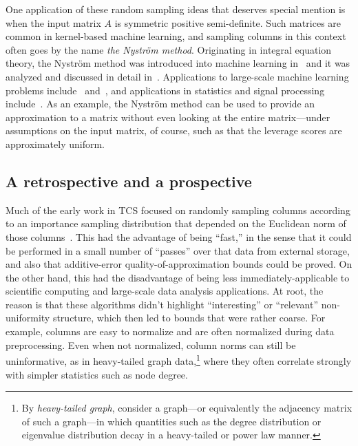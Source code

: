 \documentclass[twoside]{article}
\begin{document}
One application of these random sampling ideas that deserves special mention 
is when the input matrix $A$ is symmetric positive semi-definite. 
Such matrices are common in kernel-based machine learning, and sampling 
columns in this context often goes by the name \emph{the Nystr\"{o}m 
method}.
Originating in integral equation theory, the Nystr\"{o}m method was 
introduced into machine learning in~\cite{WS01} and it was analyzed and
discussed in detail in~\cite{dm_kernel_JRNL}.
Applications to large-scale machine learning problems 
include~\cite{TKR08,KMT09,KMT09c} and~\cite{ZTK08,LKL10,ZK10}, and
applications in statistics and signal processing 
include~\cite{PWT05,BW07_WKSHP,BW07_TR,SW08,BW08,BW09_PNAS,BW09_JRNL}.
As an example, the Nystr\"{o}m method can be used to provide an 
approximation to a matrix without even looking at the entire matrix---under 
assumptions on the input matrix, of course, such as that the leverage scores 
are approximately uniform.

\subsection{A retrospective and a prospective}

Much of the early work in TCS focused on randomly sampling columns according 
to an importance sampling distribution that depended on the Euclidean norm 
of those 
columns~\cite{FKV04,DFKVV04_JRNL,dkm_matrix1,dkm_matrix2,dkm_matrix3,RV07}.
This had the advantage of being ``fast,'' in the sense that it could be
performed in a small number of ``passes'' over that data from external 
storage, and also that additive-error quality-of-approximation bounds could 
be proved.
On the other hand, this had the disadvantage of being less 
immediately-applicable to scientific computing and large-scale data analysis 
applications.
At root, the reason is that these algorithms didn't highlight ``interesting'' or 
``relevant'' non-uniformity structure, which then led to bounds that were 
rather coarse.
For example, columns are easy to normalize and are 
often normalized during data preprocessing.
Even when not normalized, column norms can still be uninformative, as in 
heavy-tailed graph data,\footnote{By \emph{heavy-tailed graph}, consider a graph---or equivalently 
the adjacency matrix of such a graph---in which quantities such as the 
degree distribution or eigenvalue distribution decay in a heavy-tailed or 
power law manner.}
where they often correlate strongly with simpler statistics such as node 
degree.
\end{document}
